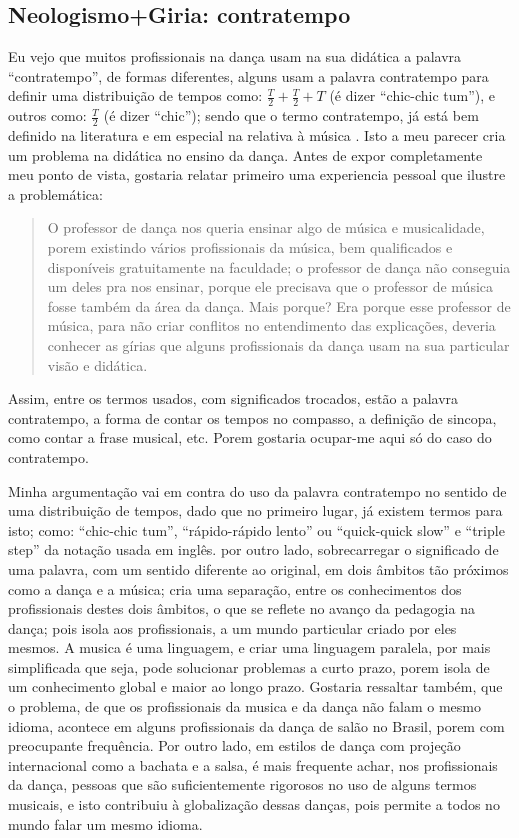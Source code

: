 \subsection{Neologismo+Giria: contratempo}
Eu vejo que muitos profissionais na dança usam na sua didática a palavra ``contratempo'', 
de formas diferentes, 
alguns usam a palavra contratempo para definir uma distribuição de tempos como: 
$\frac{T}{2}+\frac{T}{2}+T$ (é dizer ``chic-chic tum''), 
e outros como: $\frac{T}{2}$ (é dizer ``chic''); 
sendo que o termo contratempo, 
já está bem definido na literatura \cite{priberamcontratempo} e em especial na relativa à música \cite[pp. 46]{alves2004teoria}.
Isto a meu parecer cria um problema na didática no ensino da dança. 
Antes de expor completamente meu ponto de vista, gostaria relatar primeiro uma experiencia pessoal que ilustre a problemática: 
\begin{quotation}
O professor de dança nos queria ensinar algo de música e musicalidade, 
porem existindo vários profissionais da música, bem qualificados e disponíveis gratuitamente na faculdade; 
o professor de dança não conseguia um deles pra nos ensinar,
porque ele precisava que o professor de música fosse também da área da dança. 
Mais porque? Era porque esse professor de música, 
para não criar conflitos no entendimento das explicações, 
deveria conhecer as gírias que alguns profissionais da dança usam na sua particular visão e didática. 
\end{quotation}
Assim, entre os termos usados, com significados trocados, estão a palavra contratempo, 
a forma de contar os tempos no compasso, a definição de sincopa, como contar a frase musical, etc. 
Porem gostaria ocupar-me aqui só do caso do contratempo. 

Minha argumentação vai em contra do uso da palavra contratempo no sentido de uma distribuição de tempos, 
dado que no primeiro lugar, já existem termos para isto; como: ``chic-chic tum'', 
``rápido-rápido lento'' ou ``quick-quick slow'' e ``triple step'' da notação usada em inglês.
por outro lado, sobrecarregar o significado de uma palavra, com um sentido diferente ao original, 
em dois âmbitos tão próximos como a dança e a música; cria uma separação, 
entre os conhecimentos dos profissionais destes dois âmbitos, o que se reflete no avanço da pedagogia na dança; 
pois isola aos profissionais, a um mundo particular criado por eles mesmos.  
A musica é uma linguagem, e criar uma linguagem paralela, por mais simplificada que seja, 
pode solucionar problemas a curto prazo, porem isola de um conhecimento global e maior ao longo prazo.
Gostaria ressaltar também, que o problema, de que os profissionais da musica e da dança não falam o mesmo idioma, 
acontece em alguns profissionais da dança de salão no Brasil, porem com preocupante frequência. 
Por outro lado, em estilos de dança com projeção internacional como a bachata e a salsa, 
é mais frequente achar, nos profissionais da dança, pessoas que são suficientemente rigorosos  no uso de alguns termos musicais, 
e isto contribuiu à globalização dessas danças, pois permite a todos no mundo falar um mesmo idioma.

